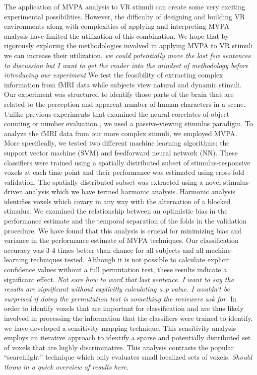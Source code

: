 \documentclass[preprint,5p,authoryear]{elsarticle}
\begin{document}
The application of MVPA analysis to VR stimuli can create some very exciting experimental possibilities.
However, the difficulty of designing and building VR environments along with complexities of applying and interpreting MVPA analysis have limited the utilization of this combination.
We hope that by rigorously exploring the methodologies involved in applying MVPA to VR stimuli we can increase their utilization.
\emph{we could potentially move the last few sentences to discussion but I want to get the reader into the mindset of methodology before introducing our experiment}
We test the feasibility of extracting complex information from fMRI data while subjects view natural and dynamic stimuli.
Our experiment was structured to identify those parts of the brain that are related to the perception and apparent number of human characters in a scene.
Unlike previous experiments that examined the neural correlates of object counting or number evaluation \citep{countingstuff}, we used a passive-viewing stimulus paradigm.
To analyze the fMRI data from our more complex stimuli, we employed MVPA.
More specifically, we tested two different machine learning algorithms: the support vector machine (SVM) and feedforward neural network (NN).
These classifiers were trained using a spatially distributed subset of stimulus-responsive voxels at each time point and their performance was estimated using cross-fold validation.
The spatially distributed subset was extracted using a novel stimulus-driven analysis which we have termed harmonic analysis.
Harmonic analysis identifies voxels which covary in any way with the alternation of a blocked stimulus.
We examined the relationship between an optimistic bias in the performance estimate and the temporal separation of the folds in the validation procedure.
We have found that this analysis is crucial for minimizing bias and variance in the performance estimate of MVPA techniques.
Our classification accuracy was 3-4 times better than chance for all subjects and all machine-learning techniques tested.
Although it is not possible to calculate explicit confidence values without a full permutation test, these results indicate a significant effect.
\emph{Not sure how to word that last sentence. I want to say the results are significant without explicitly calculating a p value. I wouldn't be surprised if doing the permutation test is something the reviewers ask for.}
In order to identify voxels that are important for classification and are thus likely involved in processing the information that the classifiers were trained to identify, we have developed a sensitivity mapping technique.
This sensitivity analysis employs an iterative approach to identify a sparse and potentially distributed set of voxels that are highly discriminative.
This analysis contrasts the popular ``searchlight'' technique which only evaluates small localized sets of voxels.
\emph{Should throw in a quick overview of results here.}
\end{document}
